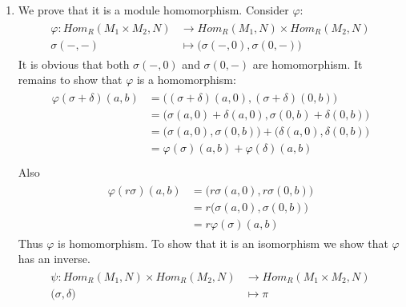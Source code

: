 \begin{enumerate}[label=]
    \item  
        We prove that it is a module homomorphism.
        Consider $\varphi$:
        \begin{gather*}
            \begin{split}
                \varphi: Hom_R(M_1 \times M_2, N) &\to Hom_R(M_1, N) \times Hom_R(M_2, N) \\
                \sigma(-, -) &\mapsto \big(\sigma(-, 0), \sigma(0, -)\big)
            \end{split}
        \end{gather*}
        It is obvious that both $\sigma(-, 0)$ and $\sigma(0, -)$ are homomorphism. It remains to show that $\varphi$ is a homomorphism:
        \begin{gather*}
            \begin{split}
                \varphi(\sigma + \delta)(a, b) & = \big((\sigma + \delta)(a, 0), (\sigma + \delta)(0, b)\big) \\
                & = \big(\sigma(a, 0) + \delta(a, 0), \sigma(0, b) + \delta(0, b)\big) \\
                & = \big(\sigma(a, 0), \sigma(0, b)\big) + \big(\delta(a, 0), \delta(0, b)\big) \\
                & = \varphi(\sigma)(a, b) + \varphi(\delta)(a, b) \\
            \end{split}
        \end{gather*}
        Also
        \begin{gather*}
            \begin{split}
                \varphi(r\sigma)(a, b) & = \big(r\sigma(a, 0), r\sigma(0, b)\big) \\
                & = r \big(\sigma(a, 0), \sigma(0, b)\big) \\
                & = r \varphi(\sigma)(a, b)
            \end{split}
        \end{gather*}
        Thus $\varphi$ is homomorphism.
        To show that it is an isomorphism we show that $\varphi$ has an inverse.
        \begin{gather*}
            \begin{split}
                \psi: Hom_R(M_1, N) \times Hom_R(M_2, N) & \to Hom_R(M_1 \times M_2, N) \\
                \big(\sigma, \delta\big) & \mapsto \pi
            \end{split}

\end{gather*}
\end{enumerate}
